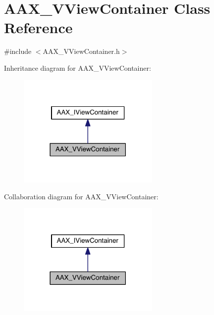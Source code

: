 \hypertarget{a00142}{}\section{A\+A\+X\+\_\+\+V\+View\+Container Class Reference}
\label{a00142}


{\ttfamily \#include $<$A\+A\+X\+\_\+\+V\+View\+Container.\+h$>$}



Inheritance diagram for A\+A\+X\+\_\+\+V\+View\+Container\+:
\nopagebreak
\begin{figure}[H]
\begin{center}
\leavevmode
\includegraphics[width=194pt]{a00722}
\end{center}
\end{figure}


Collaboration diagram for A\+A\+X\+\_\+\+V\+View\+Container\+:
\nopagebreak
\begin{figure}[H]
\begin{center}
\leavevmode
\includegraphics[width=194pt]{a00723}
\end{center}
\end{figure}


